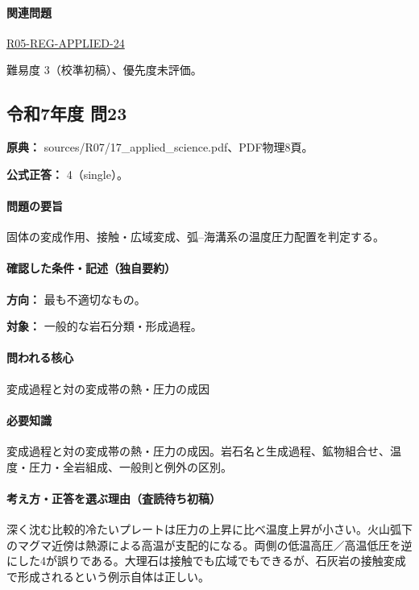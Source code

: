 \paragraph{関連問題} \hyperref[q:r05-reg-applied-24]{R05-REG-APPLIED-24}

\par 難易度 3（校準初稿）、優先度未評価。

\subsection{令和7年度 問23}
\label{q:r07-reg-applied-23}

\noindent\textbf{原典：} sources/R07/17\_applied\_science.pdf、PDF物理8頁。

\textbf{公式正答：} 4（single）。

\paragraph{問題の要旨} 固体の変成作用、接触・広域変成、弧–海溝系の温度圧力配置を判定する。

\paragraph{確認した条件・記述（独自要約）}\mbox{}\par

\noindent\textbf{方向：} 最も不適切なもの。\par

\noindent\textbf{対象：} 一般的な岩石分類・形成過程。\par

\paragraph{問われる核心} 変成過程と対の変成帯の熱・圧力の成因

\paragraph{必要知識} 変成過程と対の変成帯の熱・圧力の成因。岩石名と生成過程、鉱物組合せ、温度・圧力・全岩組成、一般則と例外の区別。

\paragraph{考え方・正答を選ぶ理由（査読待ち初稿）} 深く沈む比較的冷たいプレートは圧力の上昇に比べ温度上昇が小さい。火山弧下のマグマ近傍は熱源による高温が支配的になる。両側の低温高圧／高温低圧を逆にした4が誤りである。大理石は接触でも広域でもできるが、石灰岩の接触変成で形成されるという例示自体は正しい。

